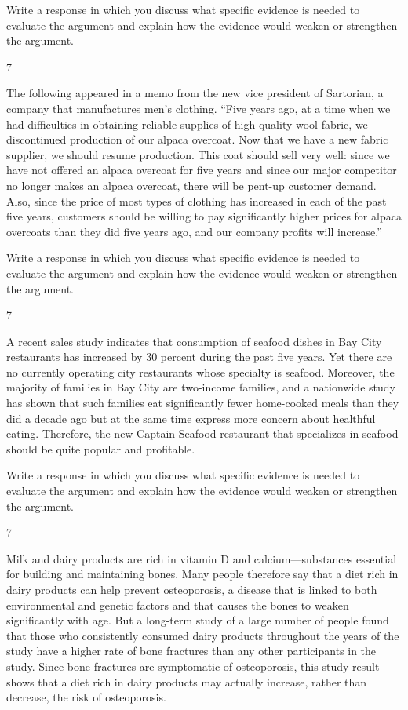 \documentclass[]{article}
\begin{document}
Write a response in which you discuss what specific evidence is needed
to evaluate the argument and explain how the evidence would weaken or
strengthen the argument.

7

The following appeared in a memo from the new vice president of
Sartorian, a company that manufactures men's clothing. ``Five years ago,
at a time when we had difficulties in obtaining reliable supplies of
high quality wool fabric, we discontinued production of our alpaca
overcoat. Now that we have a new fabric supplier, we should resume
production. This coat should sell very well: since we have not offered
an alpaca overcoat for five years and since our major competitor no
longer makes an alpaca overcoat, there will be pent-up customer demand.
Also, since the price of most types of clothing has increased in each of
the past five years, customers should be willing to pay significantly
higher prices for alpaca overcoats than they did five years ago, and our
company profits will increase.''

Write a response in which you discuss what specific evidence is needed
to evaluate the argument and explain how the evidence would weaken or
strengthen the argument.

7

A recent sales study indicates that consumption of seafood dishes in Bay
City restaurants has increased by 30 percent during the past five years.
Yet there are no currently operating city restaurants whose specialty is
seafood. Moreover, the majority of families in Bay City are two-income
families, and a nationwide study has shown that such families eat
significantly fewer home-cooked meals than they did a decade ago but at
the same time express more concern about healthful eating. Therefore,
the new Captain Seafood restaurant that specializes in seafood should be
quite popular and profitable.

Write a response in which you discuss what specific evidence is needed
to evaluate the argument and explain how the evidence would weaken or
strengthen the argument.

7

Milk and dairy products are rich in vitamin D and calcium---substances
essential for building and maintaining bones. Many people therefore say
that a diet rich in dairy products can help prevent osteoporosis, a
disease that is linked to both environmental and genetic factors and
that causes the bones to weaken significantly with age. But a long-term
study of a large number of people found that those who consistently
consumed dairy products throughout the years of the study have a higher
rate of bone fractures than any other participants in the study. Since
bone fractures are symptomatic of osteoporosis, this study result shows
that a diet rich in dairy products may actually increase, rather than
decrease, the risk of osteoporosis.
\end{document}
